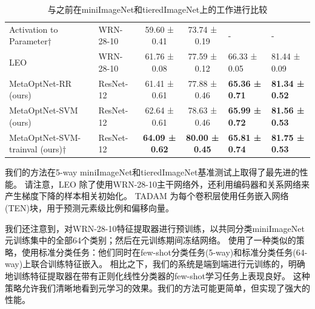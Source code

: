 \begin{table}[htbp]
{\begin{tabular}{
    l 
    l 
    c 
    c 
    l 
    l }
    Activation to Parameter† & WRN-28-10                         & 59.60 ± 0.41                                                      & 73.74 ± 0.19                                                      & -                                   & -                                   \\
    LEO                                              & WRN-28-10                         & 61.76 ± 0.08                                                      & 77.59 ± 0.12                                                      & 66.33 ± 0.05                                                & 81.44 ± 0.09                                                \\
    MetaOptNet-RR (ours)                             & ResNet-12 & 61.41 ± 0.61                                                      & 77.88 ± 0.46                                                      & \textbf{65.36 ± 0.71}                                       & \textbf{81.34 ± 0.52}                                       \\
    MetaOptNet-SVM (ours)                            & ResNet-12                         & 62.64 ± 0.61                                                      & 78.63 ± 0.46                                                      & \textbf{65.99 ± 0.72}                                       & \textbf{81.56 ± 0.53}                                       \\
    MetaOptNet-SVM-trainval (ours)†                  & ResNet-12                         & \textbf{64.09 ± 0.62} & \textbf{80.00 ± 0.45} & \textbf{65.81 ± 0.74}                                       & \textbf{81.75 ± 0.53}                                       \\
    \bottomrule
    \end{tabular}
    }
    \caption{与之前在miniImageNet和tieredImageNet上的工作进行比较}
    \label{table:1}
\end{table}
我们的方法在5-way miniImageNet和tieredImageNet基准测试上取得了最先进的性能。
请注意，LEO \cite{rusu2018meta}除了使用WRN-28-10主干网络外，还利用编码器和关系网络来产生梯度下降的样本相关初始化。
TADAM \cite{oreshkin2018tadam}为每个卷积层使用任务嵌入网络(TEN)块，用于预测元素级比例和偏移向量。

我们还注意到，\cite{rusu2018meta,qiao2018few}对WRN-28-10特征提取器\cite{zagoruyko2016wide}进行预训练，以共同分类miniImageNet元训练集中的全部64个类别；然后在元训练期间冻结网络。
\cite{oreshkin2018tadam}使用了一种类似的策略，使用标准分类任务：他们同时在few-shot分类任务(5-way)和标准分类任务(64-way)上联合训练特征嵌入。
相比之下，我们的系统是端到端进行元训练的，明确地训练特征提取器在带有正则化线性分类器的few-shot学习任务上表现良好。
这种策略允许我们清晰地看到元学习的效果。我们的方法可能更简单，但实现了强大的性能。

